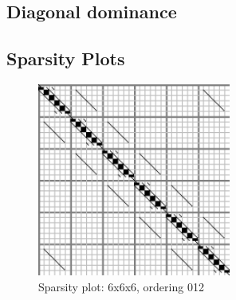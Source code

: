 \documentclass[10pt]{article}
\begin{document}
\begin{multicols}{2}
\subsection{Diagonal dominance}

\pagebreak

\subsection{Sparsity Plots}

\newcommand{\spwidth}{2.5in}
\newcommand{\spmgin}{.1in}

\begin{center}
\noindent
\begin{minipage}[t]{.5\textwidth}%
\begin{figure}[H]
	\centering
	\includegraphics[width=\spwidth]{../img/sparsity/int_small_6x6x6_012.eps}
	\caption{Sparsity plot: 6x6x6, ordering 012 }
\end{figure}
\vspace{\spmgin}
\begin{figure}[H]
	\centering

\end{figure}
\end{minipage}
\end{center}
\end{multicols}
\end{document}
